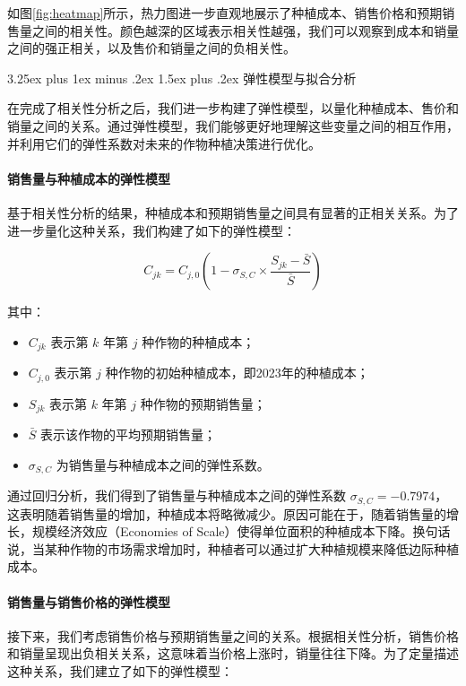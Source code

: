 \documentclass[12pt,a4paper]{nmmcm}
\makeatletter
\renewcommand\subsection{\@startsection{subsection}{2}{0pt}%
    {3.25ex plus 1ex minus .2ex}%
    {1.5ex plus .2ex}%
    {\normalfont\Large\bfseries}}
\makeatother
\begin{document}
如图\ref{fig:heatmap}所示，热力图进一步直观地展示了种植成本、销售价格和预期销售量之间的相关性。颜色越深的区域表示相关性越强，我们可以观察到成本和销量之间的强正相关，以及售价和销量之间的负相关性。

\subsection{弹性模型与拟合分析}

在完成了相关性分析之后，我们进一步构建了弹性模型，以量化种植成本、售价和销量之间的关系。通过弹性模型，我们能够更好地理解这些变量之间的相互作用，并利用它们的弹性系数对未来的作物种植决策进行优化。

\paragraph{销售量与种植成本的弹性模型}

基于相关性分析的结果，种植成本和预期销售量之间具有显著的正相关关系。为了进一步量化这种关系，我们构建了如下的弹性模型：

\[
C_{jk} = C_{j,0} \left(1 - \sigma_{S,C} \times \frac{S_{jk} - \bar{S}}{\bar{S}} \right)
\]

其中：
\begin{itemize}
    \item $C_{jk}$ 表示第 $k$ 年第 $j$ 种作物的种植成本；
    \item $C_{j,0}$ 表示第 $j$ 种作物的初始种植成本，即2023年的种植成本；
    \item $S_{jk}$ 表示第 $k$ 年第 $j$ 种作物的预期销售量；
    \item $\bar{S}$ 表示该作物的平均预期销售量；
    \item $\sigma_{S,C}$ 为销售量与种植成本之间的弹性系数。
\end{itemize}

通过回归分析，我们得到了销售量与种植成本之间的弹性系数 $\sigma_{S,C} = -0.7974$，这表明随着销售量的增加，种植成本将略微减少。原因可能在于，随着销售量的增长，规模经济效应（Economies of Scale）使得单位面积的种植成本下降。换句话说，当某种作物的市场需求增加时，种植者可以通过扩大种植规模来降低边际种植成本。

\paragraph{销售量与销售价格的弹性模型}

接下来，我们考虑销售价格与预期销售量之间的关系。根据相关性分析，销售价格和销量呈现出负相关关系，这意味着当价格上涨时，销量往往下降。为了定量描述这种关系，我们建立了如下的弹性模型：
\end{document}
